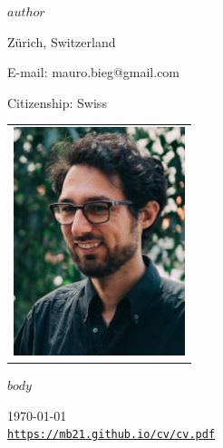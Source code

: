 \documentclass{article}
\def\name{$author$}
\def\footerlink{https://mb21.github.io/cv/cv.pdf}
\begin{document}
\begin{minipage}{10cm}
	{\huge \name}
	
	\vspace{7mm}
	
	Zürich, Switzerland\\
	
	\vspace{-3mm}
	
	E-mail: mauro.bieg@gmail.com\\
	
	\vspace{-3mm}
	
	Citizenship: Swiss
\end{minipage}
\begin{minipage}{50mm}
  \begin{tabular}{r}
  	\includegraphics[width=50mm]{me.jpg}
  \end{tabular}
\end{minipage}



$body$

\bigskip

\begin{center}
  \begin{footnotesize}
    \today \\
    \href{\footerlink}{\texttt{\footerlink}}
  \end{footnotesize}
\end{center}
\end{document}
